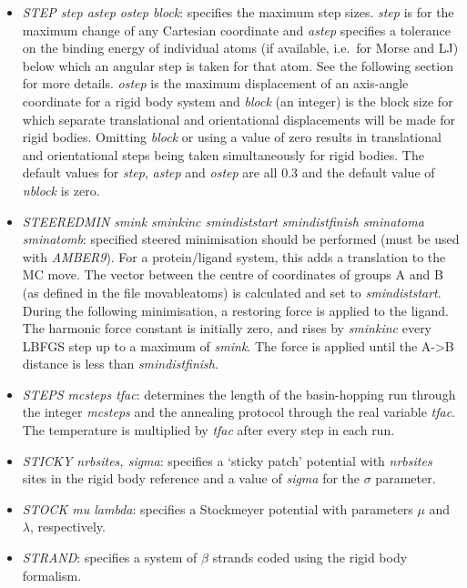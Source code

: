 \documentclass[12pt,a4paper,dvips]{article}
\begin{document}
\begin{itemize}
\item {\it STEP step astep ostep block\/}: specifies the maximum step sizes. {\it step\/} is
for the maximum change of any Cartesian coordinate and {\it astep\/} specifies a tolerance
on the binding energy of individual atoms (if available, i.e.~for Morse and LJ) below
which an angular step is taken for that atom. See the following section for more details.
{\it ostep\/} is the maximum displacement of an axis-angle coordinate for a rigid body system
and {\it block\/} (an integer) is the block size for which separate translational and orientational
displacements will be made for rigid bodies. Omitting {\it block\/} or using a value of zero results in
translational and orientational steps being taken simultaneously
for rigid bodies. The default values for {\it step\/},
{\it astep\/} and {\it ostep\/} are all 0.3 and the default value of {\it nblock\/} is zero.

\item {\it STEEREDMIN smink sminkinc smindiststart smindistfinish sminatoma sminatomb\/}: specified steered 
minimisation should be performed (must be used with {\it AMBER9}). For a protein/ligand system, this adds a translation
to the MC move. The vector between the centre of coordinates of groups A and B (as defined in the file movableatoms)
is calculated and set to {\it smindiststart}. During the following minimisation, a restoring force is applied to 
the ligand. The harmonic force constant is initially zero, and rises by {\it sminkinc} every LBFGS step up to a
maximum of {\it smink}. The force is applied until the A->B distance is less than {\it smindistfinish}.  

\item {\it STEPS mcsteps tfac\/}: determines the length of the
basin-hopping run through the integer {\it mcsteps\/} and the annealing protocol through
the real variable {\it tfac\/}. The temperature is multiplied by {\it tfac\/}
after every step in each run. 

\item {\it STICKY nrbsites, sigma\/}: specifies a `sticky patch' potential with {\it nrbsites}
sites in the rigid body reference and a value of {\it sigma} for the $\sigma$ parameter.

\item {\it STOCK mu lambda}: specifies a Stockmeyer potential with parameters
$\mu$ and $\lambda$, respectively.

\item {\it STRAND}: specifies a system of $\beta$ strands coded using the rigid body formalism.


\end{itemize}
\end{document}
